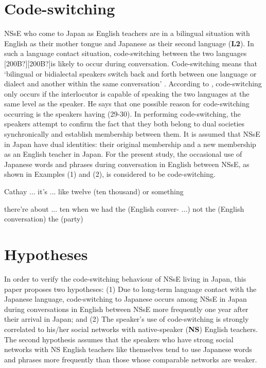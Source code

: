 \documentclass[output=paper]{LSP/langsci}
\begin{document}
\section{Code-switching}
NSsE who come to Japan as English teachers are in a bilingual situation with English as their mother tongue and Japanese as their second language (\textbf{L2}). In such a language contact situation, code-switching between the two languages [200B?][200B?]is likely to occur during conversation. Code-switching means that ‘bilingual or bidialectal speakers switch back and forth between one language or dialect and another within the same conversation’ \citep[23]{trudgill_glossary_2003}. According to \citet[26]{azuma_shakai_1997}, code-switching only occurs if the interlocutor is capable of speaking the two languages at the same level as the speaker. He says that one possible reason for code-switching occurring is the speakers having  (29-30). In performing code-switching, the speakers attempt to confirm the fact that they both belong to dual societies synchronically and establish membership between them. It is assumed that NSsE in Japan have dual identities: their original membership and a new membership as an English teacher in Japan. For the present study, the occasional use of Japanese words and phrases during conversation in English between NSsE, as shown in Examples (1) and (2), is considered to be code-switching.

\begin{exe}
\label{ex:1}
\ex Cathay ... it’s ... like twelve  (ten thousand) or something
\end{exe}

\begin{exe}
\label{ex:2}
\ex there’re about ... ten when we had the  (English conver- ...) not the    (English conversation) the  (party)
\end{exe}

\section{Hypotheses}
In order to verify the code-switching behaviour of NSsE living in Japan, this paper proposes two hypotheses: (1) Due to long-term language contact with the Japanese language, code-switching to Japanese occurs among NSsE in Japan during conversations in English between NSsE more frequently one year after their arrival in Japan; and (2) The speaker’s use of code-switching is strongly correlated to his/her social networks with native-speaker (\textbf{NS}) English teachers. The second hypothesis assumes that the speakers who have strong social networks with NS English teachers like themselves tend to use Japanese words and phrases more frequently than those whose comparable networks are weaker.
\end{document}
